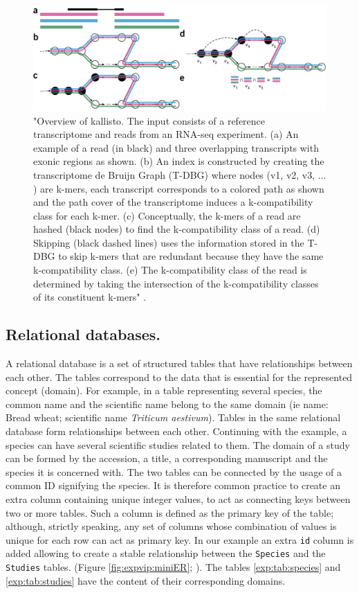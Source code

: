 \begin{figure}
\includegraphics[width=1\textwidth]{LitReview/Figures/kallisto.pdf}
\caption[Overview of kallisto.]{"Overview of kallisto. The input consists of a reference transcriptome and reads from an RNA-seq experiment. (a) An example of a read (in black) and three overlapping transcripts with exonic regions as shown. (b) An index is constructed by creating the transcriptome de Bruijn Graph (T-DBG) where
nodes (v1, v2, v3, ... ) are k-mers, each transcript corresponds to a colored path as shown and the path cover of the transcriptome induces a k-compatibility class for each k-mer. (c) Conceptually, the k-mers of a read are hashed (black nodes) to find the k-compatibility class of a read. (d) Skipping (black dashed lines) uses the information stored in the T-DBG to skip k-mers that are redundant because they have the same k-compatibility class. (e) The k-compatibility class of the read is determined by taking the intersection of the k-compatibility classes of its constituent k-mers" \citep{Bray2016}.}
\label{fig:exp:kallisto}
\end{figure}


\subsection{Relational databases.}
A relational database is a set of structured tables that have relationships between each other. 
The tables correspond to the data that is essential for the represented concept (domain).
For example, in a table representing several species, the common name and the scientific name belong to the same domain (ie name: Bread wheat; scientific name \textit{Triticum aestivum}). 
Tables in the same relational database form relationships between each other. 
Continuing with the example, a species can have several scientific studies related to them. 
The domain of a study can be formed by the accession, a title, a corresponding manuscript and the species it is concerned with. The two tables can be connected by the usage of a common ID signifying the species. It is therefore common practice to create an extra column containing unique integer values, to act as connecting keys between two or more tables. Such a column is defined as the primary key of the table; although, strictly speaking, any set of columns whose combination of values is unique for each row can act as primary key. 
In our example an extra \texttt{id} column is added allowing to create a stable relationship between the \verb|Species| and the \verb|Studies| tables.
 (Figure \ref{fig:expvip:miniER}; \citealt{Codd1970}).
The tables \ref{exp:tab:species} and \ref{exp:tab:studies} have the content of their corresponding domains. 

